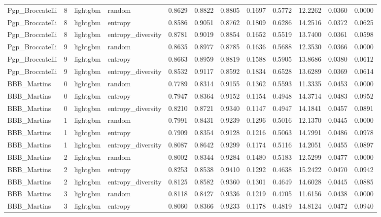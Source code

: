 \begin{tabular}{lrllrrrrrrrr}
Pgp_Broccatelli & 8 & lightgbm & random & 0.8629 & 0.8822 & 0.8805 & 0.1697 & 0.5772 & 12.2262 & 0.0360 & 0.0000 \\
Pgp_Broccatelli & 8 & lightgbm & entropy & 0.8586 & 0.9051 & 0.8762 & 0.1809 & 0.6286 & 14.2516 & 0.0372 & 0.0625 \\
Pgp_Broccatelli & 8 & lightgbm & entropy_diversity & 0.8781 & 0.9019 & 0.8854 & 0.1652 & 0.5519 & 13.7400 & 0.0361 & 0.0598 \\
Pgp_Broccatelli & 9 & lightgbm & random & 0.8635 & 0.8977 & 0.8785 & 0.1636 & 0.5688 & 12.3530 & 0.0366 & 0.0000 \\
Pgp_Broccatelli & 9 & lightgbm & entropy & 0.8663 & 0.8959 & 0.8819 & 0.1588 & 0.5905 & 13.8686 & 0.0380 & 0.0612 \\
Pgp_Broccatelli & 9 & lightgbm & entropy_diversity & 0.8532 & 0.9117 & 0.8592 & 0.1834 & 0.6528 & 13.6289 & 0.0369 & 0.0614 \\
BBB_Martins & 0 & lightgbm & random & 0.7789 & 0.8314 & 0.9155 & 0.1362 & 0.5593 & 11.3335 & 0.0453 & 0.0000 \\
BBB_Martins & 0 & lightgbm & entropy & 0.7947 & 0.8364 & 0.9152 & 0.1154 & 0.4948 & 14.3714 & 0.0483 & 0.0952 \\
BBB_Martins & 0 & lightgbm & entropy_diversity & 0.8210 & 0.8721 & 0.9340 & 0.1147 & 0.4947 & 14.1841 & 0.0457 & 0.0891 \\
BBB_Martins & 1 & lightgbm & random & 0.7991 & 0.8431 & 0.9239 & 0.1296 & 0.5016 & 12.1370 & 0.0445 & 0.0000 \\
BBB_Martins & 1 & lightgbm & entropy & 0.7909 & 0.8354 & 0.9128 & 0.1216 & 0.5063 & 14.7991 & 0.0486 & 0.0978 \\
BBB_Martins & 1 & lightgbm & entropy_diversity & 0.8087 & 0.8642 & 0.9299 & 0.1174 & 0.5116 & 14.2051 & 0.0455 & 0.0897 \\
BBB_Martins & 2 & lightgbm & random & 0.8002 & 0.8344 & 0.9284 & 0.1480 & 0.5183 & 12.5299 & 0.0477 & 0.0000 \\
BBB_Martins & 2 & lightgbm & entropy & 0.8253 & 0.8538 & 0.9410 & 0.1292 & 0.4638 & 15.2422 & 0.0470 & 0.0942 \\
BBB_Martins & 2 & lightgbm & entropy_diversity & 0.8125 & 0.8582 & 0.9360 & 0.1301 & 0.4649 & 14.6028 & 0.0445 & 0.0885 \\
BBB_Martins & 3 & lightgbm & random & 0.8118 & 0.8427 & 0.9336 & 0.1219 & 0.4705 & 11.6156 & 0.0438 & 0.0000 \\
BBB_Martins & 3 & lightgbm & entropy & 0.8060 & 0.8366 & 0.9233 & 0.1178 & 0.4819 & 14.8124 & 0.0472 & 0.0940 \\

\end{tabular}
